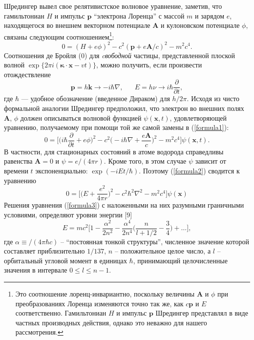 \documentclass[a5paper,10pt]{article}
\begin{document}
\pagestyle{fancy}
\setlength{\abovedisplayskip}{6pt}
\setlength{\abovedisplayshortskip}{6pt}
\setlength{\belowdisplayskip}{6pt}
\setlength{\belowdisplayshortskip}{6pt}
Шредингер вывел свое релятивистское волновое уравнение, заметив, что гамильтониан $H$ и импульс $\textbf{p}$ ``электрона Лоренца'' с массой $m$ и зарядом $e$, находящегося во внешнем векторном потенциале $\textbf{A}$ и кулоновском потенциале $\phi$, связаны следующим соотношением\footnote{Это соотношение лоренц-инвариантно, поскольку величины $\textbf{A}$ и $\phi$ при преобразованиях Лоренца изменяются точно так же, как $c\textbf{p}$ и $E$ соответственно. Гамильтониан $H$ и импульс $\textbf{p}$ Шредингер представлял в виде частных производных действия, однако это неважно для нашего рассмотрения.}:
\begin{equation}
\label{formula1}
0 = (H+e\phi )^2-c^2(\textbf{p} +e\textbf{A} /c)^2-m^2c^4.
\end{equation}
Соотношения де Бройля (0) для \textit{cвободной} частицы, представленной плоской волной $\exp \{ 2 \pi i( \boldsymbol {\kappa} \cdot \textbf{x} -vt) \} $, можно получить, если произвести отождествление
\begin{equation}
\textbf{p} = h\textbf{k}\rightarrow -i\hbar\nabla,\;\;\;\;\;\; E=h\nu \rightarrow i\hbar \frac{\partial}{\partial t},
\end{equation}
где $\hbar$ — удобное обозначение (введенное Дираком) для $h/2 \pi$. Исходя из чисто формальной аналогии Шредингер предположил, что электрон во внешних полях $\textbf{A}$, $\phi$ должен описываться волновой функцией $\psi(\textbf{x},t)$, удовлетворяющей уравнению, получаемому при помощи той же самой замены в (\ref{formula1}):
\begin{equation}
\label{formula2}
0 = \biggl[\biggl(i\hbar \frac{\partial}{\partial t}+e\phi \biggr)^2 - c^2\biggl(-i\hbar \nabla +\frac{e \textbf{A}}{c}\biggr)^2-m^2c^4\biggr]\psi (\textbf {x},t).
\end{equation}
В частности, для стационарных состояний в атоме водорода справедливы равенства $\textbf{A} = 0$ и $\psi = e/(4\pi r)$. Кроме того, в этом случае $\psi$ зависит от времени $t$ экспоненциально: $\exp(-iEt/\hbar)$. Поэтому (\ref{formula2}) сводится к уравнению
\begin{equation}
\label{formula3}
0 = \biggl[\biggl(E+\frac{e^2}{4\pi r}\biggr)^2-c^2\hbar^2\nabla^2-m^2c^4\biggr]\psi (\textbf{x})
\end{equation}
Решения уравнения (\ref{formula3}) с наложенными на них разумными граничными условиями, определяют уровни энергии [9]
\begin{equation}
E = mc^2\biggl[1-\frac{\alpha^2}{2n^2}-\frac{\alpha^4}{2n^4}\biggl(\frac{n}{l+1/2}-\frac{3}{4}\biggl)+\ldots \biggr],
\end{equation}
где $\alpha\equiv /(4\pi\hbar c)$ -- ``постоянная тонкой структуры'', численное значение которой составляет приблизительно $1/137$, $n$ -- положительное целое число, а $l$ -- орбитальный угловой момент в единицах $\hbar$, принимающий целочисленные значения в интервале $0\le l\le n-1$.
\end{document}
